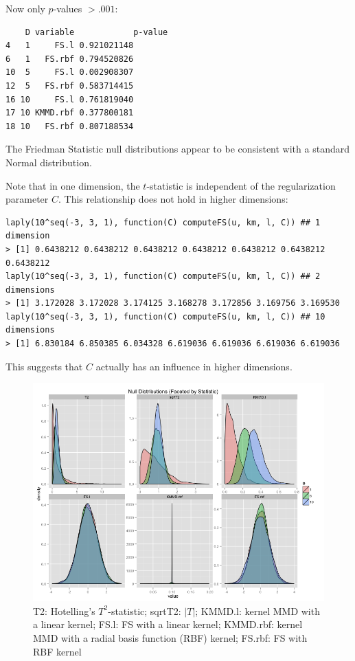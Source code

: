 Now only $p$-values $> .001$:
\begin{verbatim}
    D variable            p-value
4   1     FS.l 0.921021148
6   1   FS.rbf 0.794520826
10  5     FS.l 0.002908307
12  5   FS.rbf 0.583714415
16 10     FS.l 0.761819040
17 10 KMMD.rbf 0.377800181
18 10   FS.rbf 0.807188534
\end{verbatim}

The Friedman Statistic null distributions appear to be consistent with
a standard Normal distribution.

Note that in one dimension, the $t$-statistic is independent of the
regularization parameter $C$.  This relationship does not hold in
higher dimensions:
\begin{verbatim}
laply(10^seq(-3, 3, 1), function(C) computeFS(u, km, l, C)) ## 1 dimension
> [1] 0.6438212 0.6438212 0.6438212 0.6438212 0.6438212 0.6438212 0.6438212
laply(10^seq(-3, 3, 1), function(C) computeFS(u, km, l, C)) ## 2 dimensions
> [1] 3.172028 3.172028 3.174125 3.168278 3.172856 3.169756 3.169530
laply(10^seq(-3, 3, 1), function(C) computeFS(u, km, l, C)) ## 10 dimensions
> [1] 6.830184 6.850385 6.034328 6.619036 6.619036 6.619036 6.619036
\end{verbatim}
This suggests that $C$ actually has an influence in higher dimensions.

\begin{figure}
\centering
\includegraphics[width=.8\linewidth]{null_dist.png}
\caption{T2: Hotelling's $T^2$-statistic; sqrtT2: $|T|$;
KMMD.l: kernel MMD with a linear kernel; FS.l: FS with a
linear kernel; KMMD.rbf: kernel MMD with a radial basis function (RBF) kernel;
FS.rbf: FS with RBF kernel}
\label{fig:null_dist}
\end{figure}

